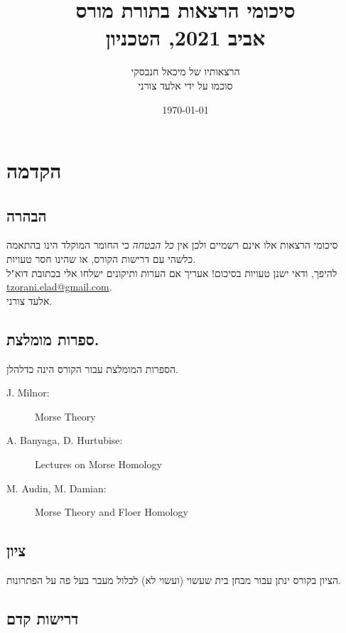 \documentclass[a4paper,10pt,twoside,openany]{book}
\title{סיכומי הרצאות בתורת מורס \\ \large{אביב 2021, הטכניון}}
\author{הרצאותיו של מיכאל חנבסקי \\ \large סוכמו על ידי אלעד צורני}
\date{\today}
\begin{document}
\frontmatter
{}
\tableofcontents
\countlectures
\newpage

\chapter*{הקדמה}
 

\section*{הבהרה}

סיכומי הרצאות אלו אינם רשמיים ולכן אין
\emph{כל הבטחה}
כי החומר המוקלד הינו בהתאמה כלשהי עם דרישות הקורס, או שהינו חסר טעויות.
\\
להיפך, ודאי ישנן טעויות בסיכום! אעריך אם הערות ותיקונים ישלחו אלי בכתובת דוא"ל
\textenglish{\href{mailto:tzorani.elad@gmail.com}{tzorani.elad@gmail.com}}.\\
אלעד צורני.

\section*{ספרות מומלצת.}

הספרות המומלצת עבור הקורס הינה כדלהלן.

\begin{english}
\begin{description}
\item[J. Milnor:] Morse Theory

\item[A. Banyaga, D. Hurtubise:] Lectures on Morse Homology

\item[M. Audin, M. Damian:] Morse Theory and Floer Homology
\end{description}
\end{english}

\section*{ציון}
הציון בקורס ינתן עבור מבחן בית שעשוי (ועשוי לא) לכלול מעבר בעל פה על הפתרונות.

\section*{דרישות קדם}
\end{document}
